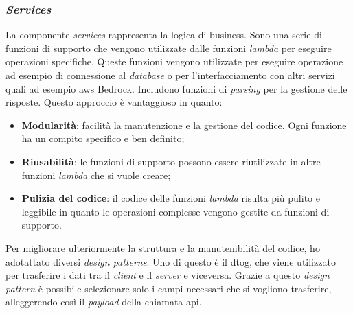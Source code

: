 \subsubsection{\textit{Services}}
La componente \textit{services} rappresenta la logica di business. Sono una serie di funzioni di supporto che vengono utilizzate dalle funzioni \textit{lambda} per eseguire operazioni specifiche. Queste funzioni vengono utilizzate per eseguire operazione ad esempio di connessione al \textit{database} o per l'interfacciamento con altri servizi quali ad esempio \gls{aws} Bedrock. Includono funzioni di \textit{parsing} per la gestione delle risposte. Questo approccio è vantaggioso in quanto:
\begin{itemize}
    \item \textbf{Modularità}: facilità la manutenzione e la gestione del codice. Ogni funzione ha un compito specifico e ben definito;
    \item \textbf{Riusabilità}: le funzioni di supporto possono essere riutilizzate in altre funzioni \textit{lambda} che si vuole creare;
    \item \textbf{Pulizia del codice}: il codice delle funzioni \textit{lambda} risulta più pulito e leggibile in quanto le operazioni complesse vengono gestite da funzioni di supporto.
\end{itemize}
\noindent
Per migliorare ulteriormente la struttura e la manutenibilità del codice, ho adotattato diversi \textit{design patterns}. Uno di questo è il \gls{dtog}, che viene utilizzato per trasferire i dati tra il \textit{client} e il \textit{server} e viceversa. Grazie a questo \textit{design pattern} è possibile selezionare solo i campi necessari che si vogliono trasferire, alleggerendo così il \textit{payload} della chiamata \gls{api}.

